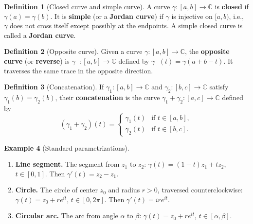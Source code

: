 \documentclass[12pt,a4paper,openany]{book}
\theoremstyle{definition}
\newtheorem{definition}{Definition}[chapter]
\newtheorem{example}[definition]{Example}
\theoremstyle{plain}
\theoremstyle{remark}
\newcommand{\C}{\mathbb{C}}
\begin{document}
\begin{definition}[Closed curve and simple curve]\label{def:closed-simple-curve}
A curve $\gamma\colon[a,b]\to\C$ is \textbf{closed} if
$\gamma(a)=\gamma(b)$.  It is \textbf{simple} (or a
\textbf{Jordan curve}) if $\gamma$ is injective on
$[a,b)$, i.e., $\gamma$ does not cross itself except possibly at the endpoints.
A simple closed curve is called a \textbf{Jordan curve}.
\end{definition}

\begin{definition}[Opposite curve]\label{def:opposite-curve}
Given a curve $\gamma\colon[a,b]\to\C$, the \textbf{opposite curve}
(or \textbf{reverse}) is $\gamma^-\colon[a,b]\to\C$ defined by
$\gamma^-(t) = \gamma(a+b-t)$.  It traverses the same trace in the
opposite direction.
\end{definition}

\begin{definition}[Concatenation]\label{def:concatenation}
If $\gamma_1\colon[a,b]\to\C$ and $\gamma_2\colon[b,c]\to\C$ satisfy
$\gamma_1(b)=\gamma_2(b)$, their \textbf{concatenation} is the curve
$\gamma_1+\gamma_2\colon[a,c]\to\C$ defined by
\[
  (\gamma_1+\gamma_2)(t) = \begin{cases}
    \gamma_1(t) & \text{if } t\in[a,b], \\
    \gamma_2(t) & \text{if } t\in[b,c].
  \end{cases}
\]
\end{definition}

\begin{example}[Standard parametrizations]\label{ex:standard-param}
\leavevmode
\begin{enumerate}[label=\textup{(\alph*)}]
  \item \textbf{Line segment.} The segment from $z_1$ to $z_2$:
    $\gamma(t)=(1-t)z_1+tz_2$, $t\in[0,1]$.  Then $\gamma'(t)=z_2-z_1$.
  \item \textbf{Circle.} The circle of center $z_0$ and radius $r>0$,
    traversed counterclockwise:
    $\gamma(t) = z_0 + re^{it}$, $t\in[0,2\pi]$.
    Then $\gamma'(t)=ire^{it}$.
  \item \textbf{Circular arc.} The arc from angle $\alpha$ to $\beta$:
    $\gamma(t) = z_0 + re^{it}$, $t\in[\alpha,\beta]$.
\end{enumerate}
\end{example}
\end{document}
